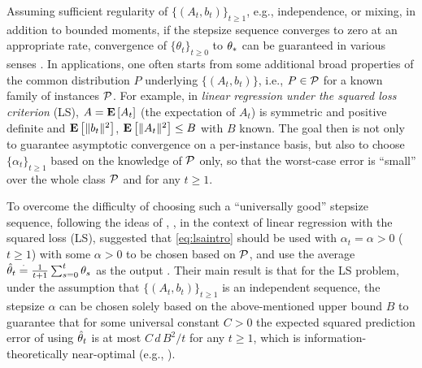 Assuming sufficient regularity of $\{(A_t,b_t)\}_{t\ge 1}$, e.g., independence, or mixing, in addition to bounded moments, if the stepsize sequence converges to zero at an appropriate rate,
convergence of $\{\theta_t\}_{t\ge 0}$ to $\theta_*$ can be guaranteed in various senses \cite{bemepri90,borkarbook}. 
In applications, one often starts from some additional broad properties of the common distribution
$P$ underlying $\{(A_t,b_t)\}$, i.e., $P\in \mathcal{P}$ for a known family of instances $\mathcal{P}$.
For example, in \emph{linear regression under the squared loss criterion} (LS), 
$A= \mathbf{E}\left[A_t\right]$ (the expectation of $A_t$) 
is symmetric and positive definite and $\mathbf{E}\left[\| b_t\|^2\right]$, 
$\mathbf{E}\left[\| A_t\|^2\right]\le B$ with $B$ known.
The goal then is not only to guarantee asymptotic convergence on a per-instance basis, 
but also to choose $\{\alpha_t\}_{t\ge 1}$ based on the knowledge of $\mathcal{P}$ only, 
so that the worst-case error is  ``small'' 
over the whole class $\mathcal{P}$ and for any  $t\ge 1$.

To overcome the difficulty of choosing such a ``universally good'' stepsize sequence,
following the ideas of \citet{ruppert}, \citet{polyak-judisky},
in the context of linear regression with the squared loss (LS),
\citeauthor{bach-moulines} suggested that
\eqref{eq:lsaintro} should be used with $\alpha_t=\alpha>0$ ($t\ge 1$) 
with some $\alpha>0$ to be chosen based on $\mathcal{P}$, 
and use the average $\hat{\theta}_t\stackrel{\cdot}{=}\frac{1}{t+1}\sum_{s=0}^t \theta_s$ as the output
\cite{bach-moulines}.
Their main result 
is that for the LS problem, 
under the assumption that $\{(A_t,b_t)\}_{t\ge 1}$ is an independent sequence, 
the stepsize $\alpha$ can be chosen solely based on the above-mentioned 
upper bound $B$ 
to guarantee that for some universal constant $C>0$
the expected squared prediction error of using $\hat{\theta}_t$ is at most $C \,d\, B^2/t$ for any $t\ge 1$,
which
is information-theoretically near-optimal (e.g., \cite{Sha15}).

